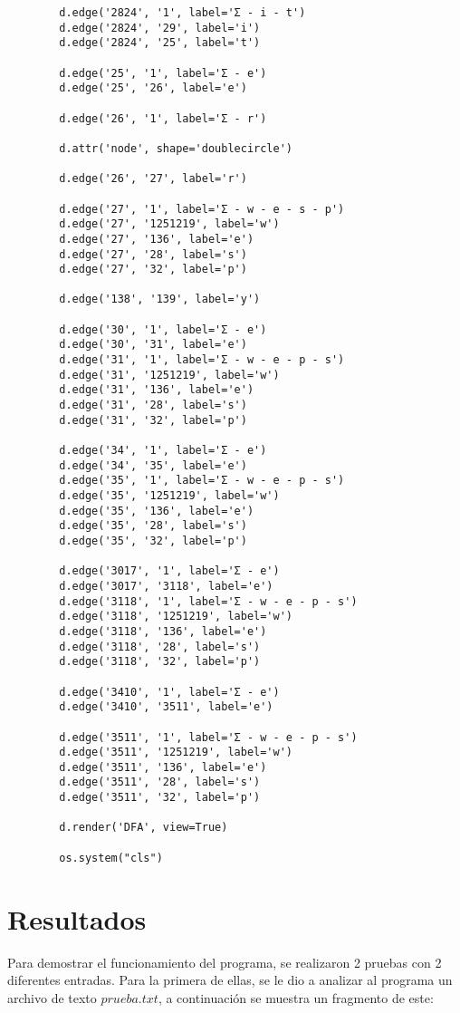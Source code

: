 \documentclass{article}
\begin{document}
\begin{lstlisting}
		d.edge('2824', '1', label='Σ - i - t')
		d.edge('2824', '29', label='i')
		d.edge('2824', '25', label='t')
		
		d.edge('25', '1', label='Σ - e')
		d.edge('25', '26', label='e')
		
		d.edge('26', '1', label='Σ - r')
		
		d.attr('node', shape='doublecircle')
		
		d.edge('26', '27', label='r')
		
		d.edge('27', '1', label='Σ - w - e - s - p')
		d.edge('27', '1251219', label='w')
		d.edge('27', '136', label='e')
		d.edge('27', '28', label='s')
		d.edge('27', '32', label='p')
		
		d.edge('138', '139', label='y')
		
		d.edge('30', '1', label='Σ - e')
		d.edge('30', '31', label='e')
		d.edge('31', '1', label='Σ - w - e - p - s')
		d.edge('31', '1251219', label='w')
		d.edge('31', '136', label='e')
		d.edge('31', '28', label='s')
		d.edge('31', '32', label='p')
		
		d.edge('34', '1', label='Σ - e')
		d.edge('34', '35', label='e')
		d.edge('35', '1', label='Σ - w - e - p - s')
		d.edge('35', '1251219', label='w')
		d.edge('35', '136', label='e')
		d.edge('35', '28', label='s')
		d.edge('35', '32', label='p')
		
		d.edge('3017', '1', label='Σ - e')
		d.edge('3017', '3118', label='e')
		d.edge('3118', '1', label='Σ - w - e - p - s')
		d.edge('3118', '1251219', label='w')
		d.edge('3118', '136', label='e')
		d.edge('3118', '28', label='s')
		d.edge('3118', '32', label='p')
		
		d.edge('3410', '1', label='Σ - e')
		d.edge('3410', '3511', label='e')
		
		d.edge('3511', '1', label='Σ - w - e - p - s')
		d.edge('3511', '1251219', label='w')
		d.edge('3511', '136', label='e')
		d.edge('3511', '28', label='s')
		d.edge('3511', '32', label='p')
		
		d.render('DFA', view=True)
		
		os.system("cls")
	\end{lstlisting}
	
	\section{Resultados}
	
	Para demostrar el funcionamiento del programa, se realizaron 2 pruebas con 2 diferentes entradas. Para la primera de ellas, se le dio a analizar al programa un archivo de texto $prueba.txt$, a continuación se muestra un fragmento de este:
	
\end{document}
